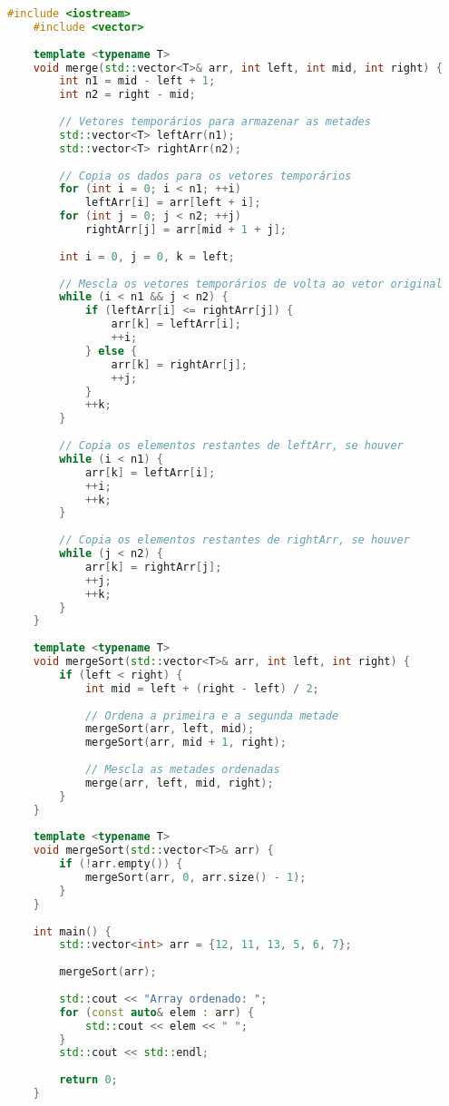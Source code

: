 \documentclass{article}
\begin{document}
\begin{lstlisting}[language=C++, caption=merge sort]
    #include <iostream>
    #include <vector>
    
    template <typename T>
    void merge(std::vector<T>& arr, int left, int mid, int right) {
        int n1 = mid - left + 1;
        int n2 = right - mid;
    
        // Vetores temporários para armazenar as metades
        std::vector<T> leftArr(n1);
        std::vector<T> rightArr(n2);
    
        // Copia os dados para os vetores temporários
        for (int i = 0; i < n1; ++i)
            leftArr[i] = arr[left + i];
        for (int j = 0; j < n2; ++j)
            rightArr[j] = arr[mid + 1 + j];
    
        int i = 0, j = 0, k = left;
    
        // Mescla os vetores temporários de volta ao vetor original
        while (i < n1 && j < n2) {
            if (leftArr[i] <= rightArr[j]) {
                arr[k] = leftArr[i];
                ++i;
            } else {
                arr[k] = rightArr[j];
                ++j;
            }
            ++k;
        }
    
        // Copia os elementos restantes de leftArr, se houver
        while (i < n1) {
            arr[k] = leftArr[i];
            ++i;
            ++k;
        }
    
        // Copia os elementos restantes de rightArr, se houver
        while (j < n2) {
            arr[k] = rightArr[j];
            ++j;
            ++k;
        }
    }
    
    template <typename T>
    void mergeSort(std::vector<T>& arr, int left, int right) {
        if (left < right) {
            int mid = left + (right - left) / 2;
    
            // Ordena a primeira e a segunda metade
            mergeSort(arr, left, mid);
            mergeSort(arr, mid + 1, right);
    
            // Mescla as metades ordenadas
            merge(arr, left, mid, right);
        }
    }
    
    template <typename T>
    void mergeSort(std::vector<T>& arr) {
        if (!arr.empty()) {
            mergeSort(arr, 0, arr.size() - 1);
        }
    }
    
    int main() {
        std::vector<int> arr = {12, 11, 13, 5, 6, 7};
    
        mergeSort(arr);
    
        std::cout << "Array ordenado: ";
        for (const auto& elem : arr) {
            std::cout << elem << " ";
        }
        std::cout << std::endl;
    
        return 0;
    }
\end{lstlisting}
\end{document}

